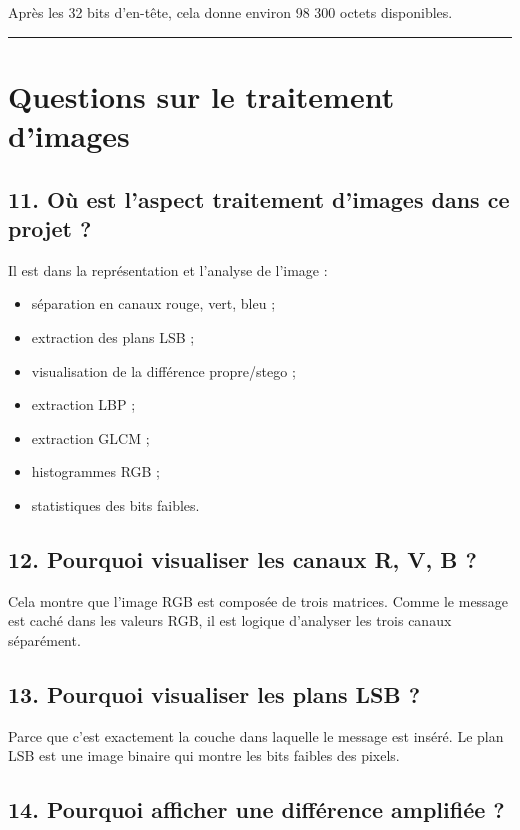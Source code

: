 \documentclass[11pt,a4paper]{article}
\begin{document}
Après les 32 bits d'en-tête, cela donne environ 98 300 octets disponibles.

\hrule

\section{Questions sur le traitement d'images}

\subsection{11. Où est l'aspect traitement d'images dans ce projet ?}

Il est dans la représentation et l'analyse de l'image :

\begin{itemize}
\item séparation en canaux rouge, vert, bleu ;
\item extraction des plans LSB ;
\item visualisation de la différence propre/stego ;
\item extraction LBP ;
\item extraction GLCM ;
\item histogrammes RGB ;
\item statistiques des bits faibles.
\end{itemize}

\subsection{12. Pourquoi visualiser les canaux R, V, B ?}

Cela montre que l'image RGB est composée de trois matrices. Comme le message est caché dans les valeurs RGB, il est logique d'analyser les trois canaux séparément.

\subsection{13. Pourquoi visualiser les plans LSB ?}

Parce que c'est exactement la couche dans laquelle le message est inséré. Le plan LSB est une image binaire qui montre les bits faibles des pixels.

\subsection{14. Pourquoi afficher une différence amplifiée ?}
\end{document}
